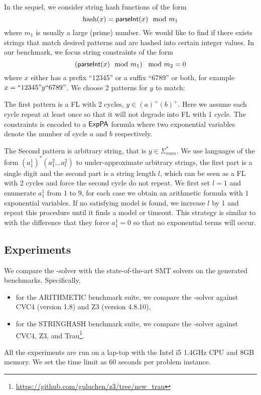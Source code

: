 {%

In the sequel, we consider string hash functions of the form  
\begin{equation}
    \text{hash}(x)= \textsf{parseInt}(x) \mod m_1  \notag
\end{equation}
where $m_1$ is usually a large (prime) number. We would like to find if there exists strings that match desired patterns and are hashed into certain integer values. In our benchmark, we focus string constraints of the form
\begin{equation}
    \left( \textsf{parseInt}(x) \mod m_1\right) \mod m_2 = 0   \notag
\end{equation}
where $x$ either has a prefix ``12345'' or a suffix ``6789'' or both, for example $x=``12345"y``6789"$. We choose 2 patterns for $y$ to match: 

The first pattern is a FL with 2 cycles, $y \in (a)^+(b)^+$. Here we assume each cycle repeat at least once so that it will not degrade into FL with 1 cycle. The constraints is encoded to a ${\sf ExpPA}$ formula where two exponential variables denote the number of cycle $a$ and $b$ respectively.

The Second pattern is arbitrary string, that is $y\in \Sigma_{num}^*$. We use languages of the form $(a^1_1)^* (a^2_1...a^2_l)$ to under-approximate arbitrary strings, the first part is a single digit and the second part is a string length $l$, which can be seen as a FL with 2 cycles and force the second cycle do not repeat. We first set $l=1$ and enumerate $a^1_1$ from $1$ to $9$, for each case we obtain an arithmetic formula with $1$ exponential variables. If no satisfying model is found, we increase $l$ by 1 and repeat this procedure until it finds a model or timeout. This strategy is similar to \cite{Abdulla2020} with the difference that they force $a^1_1=0$ so that no exponential terms will occur.
}

\subsection{Experiments}

We compare the {\paexp}-solver with the state-of-the-art SMT solvers on the generated benchmarks. Specifically, 
\begin{itemize}
\item for the ARITHMETIC benchmark suite, we compare the {\paexp}-solver against CVC4 (version 1.8) and Z3 (version 4.8.10),
\item for the STRINGHASH benchmark suite, we compare the {\paexp}-solver against CVC4, Z3, and Trau\footnote{\url{https://github.com/guluchen/z3/tree/new_trau}}. 
\end{itemize}
All the experiments are run on a lap-top with the Intel i5 1.4GHz CPU and 8GB memory. We set the time limit as 60 seconds per problem instance. 

